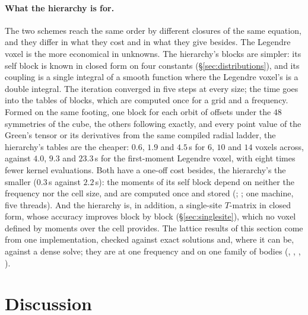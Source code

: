 \documentclass[11pt,a4paper]{article}
\begin{document}
\paragraph{What the hierarchy is for.} The two schemes reach the same order by different closures of
the same equation, and they differ in what they cost and in what they give besides. The Legendre voxel
is the more economical in unknowns. The hierarchy's blocks are simpler: its self block is known in
closed form on four constants (\S\ref{sec:distributions}), and its coupling is a single integral of a
smooth function where the Legendre voxel's is a double integral. The iteration converged in five steps
at every size; the time goes into the tables of blocks, which are computed once for a grid and a
frequency. Formed on the same footing, one block for each orbit of offsets under the $48$ symmetries of
the cube, the others following exactly, and every point value of the Green's tensor or its derivatives
from the same compiled radial ladder, the hierarchy's tables are the cheaper: $0.6$, $1.9$ and
$4.5$\,s for $6$, $10$ and $14$ voxels across, against $4.0$, $9.3$ and $23.3$\,s for the first-moment
Legendre voxel, with eight times fewer kernel evaluations. Both have a one-off cost besides, the
hierarchy's the smaller ($0.3$\,s against $2.2$\,s): the moments of its self block depend on neither
the frequency nor the cell size, and are computed once and stored
(; ; one machine,
five threads). And the hierarchy is, in
addition, a single-site $T$-matrix in closed form, whose accuracy improves block by block
(\S\ref{sec:singlesite}), which no voxel defined by moments over the cell provides. The lattice results
of this section come from one implementation, checked against exact solutions and, where it can be,
against a dense solve; they are at one frequency and on one family of bodies
(, ,
,
).

\FloatBarrier


\section{Discussion}\label{sec:discussion}
\end{document}
